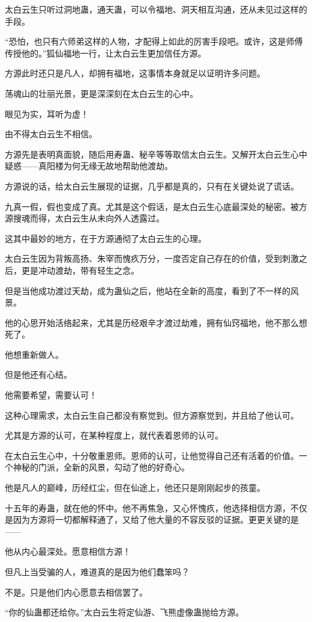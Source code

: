 \begin{this_body}
太白云生只听过洞地蛊，通天蛊，可以令福地、洞天相互沟通，还从未见过这样的手段。

“恐怕，也只有六师弟这样的人物，才配得上如此的厉害手段吧。或许，这是师傅传授他的。”狐仙福地一行，让太白云生更加信任方源。

方源此时还只是凡人，却拥有福地，这事情本身就足以证明许多问题。

荡魂山的壮丽光景，更是深深刻在太白云生的心中。

眼见为实，耳听为虚！

由不得太白云生不相信。

方源先是表明真面貌，随后用寿蛊、秘辛等等取信太白云生。又解开太白云生心中疑惑——真阳楼为何无缘无故地帮助他渡劫。

方源说的话，给太白云生展现的证据，几乎都是真的，只有在关键处说了谎话。

九真一假，假也变成了真。尤其是这个假话，是太白云生心底最深处的秘密。被方源搜魂而得，太白云生从未向外人透露过。

这其中最妙的地方，在于方源通彻了太白云生的心理。

太白云生因为背叛高扬、朱宰而愧疚万分，一度否定自己存在的价值，受到刺激之后，更是冲动渡劫，带有轻生之念。

但是当他成功渡过天劫，成为蛊仙之后，他站在全新的高度，看到了不一样的风景。

他的心思开始活络起来，尤其是历经艰辛才渡过劫难，拥有仙窍福地，他不那么想死了。

他想重新做人。

但是他还有心结。

他需要希望，需要认可！

这种心理需求，太白云生自己都没有察觉到。但方源察觉到，并且给了他认可。

尤其是方源的认可，在某种程度上，就代表着恩师的认可。

在太白云生心中，十分敬重恩师。恩师的认可，让他觉得自己还有活着的价值。一个神秘的门派，全新的风景，勾动了他的好奇心。

他是凡人的巅峰，历经红尘，但在仙途上，他还只是刚刚起步的孩童。

十五年的寿蛊，就在他的怀中。他不再焦急，又心怀愧疚，他选择相信方源，不仅是因为方源将一切都解释通了，又给了他大量的不容反驳的证据。更更关键的是——

他从内心最深处。愿意相信方源！

但凡上当受骗的人，难道真的是因为他们蠢笨吗？

不是。只是他们内心愿意去相信罢了。

“你的仙蛊都还给你。”太白云生将定仙游、飞熊虚像蛊抛给方源。


\end{this_body}
